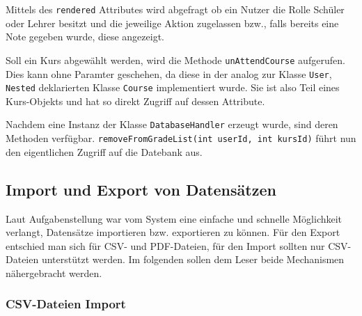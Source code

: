 Mittels des \texttt{rendered} Attributes wird abgefragt ob ein Nutzer die Rolle Schüler oder Lehrer besitzt und die jeweilige Aktion zugelassen bzw., falls bereits eine Note gegeben wurde, diese angezeigt. 
	
Soll ein Kurs abgewählt werden, wird die Methode \texttt{unAttendCourse} aufgerufen. Dies kann ohne Paramter geschehen, da diese in der analog zur Klasse \texttt{User}, \texttt{Nested}  deklarierten Klasse \texttt{Course} implementiert wurde. Sie ist also Teil eines Kurs-Objekts und hat so direkt Zugriff auf dessen Attribute. 
	
Nachdem eine Instanz der Klasse \texttt{DatabaseHandler} erzeugt wurde, sind deren Methoden verfügbar. \texttt{removeFromGradeList(int userId, int kursId)} führt nun den eigentlichen Zugriff auf die Datebank aus.	
		

\subsection{Import und Export von Datensätzen}
Laut Aufgabenstellung war vom System eine einfache und schnelle Möglichkeit verlangt, Datensätze importieren bzw. exportieren zu können.
Für den Export entschied man sich für CSV- und PDF-Dateien, für den Import sollten nur CSV-Dateien unterstützt werden.
Im folgenden sollen dem Leser beide Mechanismen nähergebracht werden. 

\subsubsection{CSV-Dateien Import}

